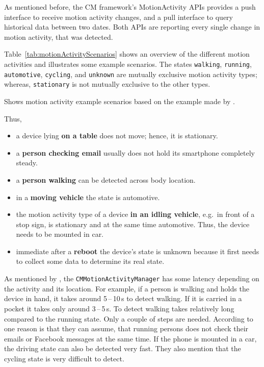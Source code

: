 As mentioned before, the \ac{CM} framework's MotionActivity \acsp{API} provides a push interface to receive motion activity changes, and a pull interface to query historical data between two dates. Both \acsp{API} are reporting every single change in motion activity, that was detected.

Table~\ref{tab:motionActivityScenarios} shows an overview of the different motion activities and illustrates some example scenarios. The states \texttt{walking}, \texttt{running}, \texttt{automotive}, \texttt{cycling}, and \texttt{unknown} are mutually exclusive motion activity types; whereas, \texttt{stationary} is not mutually exclusive to the other types.

\begin{table}
	
	\caption{Shows motion activity example scenarios based on the example made by \citet{apple:wwdc_2014_pham}.}
	\label{tab:motionActivityScenarios}
\end{table}


Thus,
\begin{itemize}
  \item a device lying \textbf{on a table} does not move; hence, it is stationary. %
  \item a \textbf{person checking email}  usually does not hold its smartphone completely steady.
  \item a \textbf{person walking} can be detected across body location.
  \item in a \textbf{moving vehicle} the state is automotive.
  \item the motion activity type of a device \textbf{in an idling vehicle}, e.g.\ in front of a stop sign, is stationary and at the same time automotive. Thus, the device needs to be mounted in car.

  \item immediate after a \textbf{reboot} the device's state is unknown because it first needs to collect some data to determine its real state.
\end{itemize}

\noindent As mentioned by \citet{apple:wwdc_2014_pham}, the \texttt{CMMotionActivityManager} has some latency depending on the activity and its location. For example, if a person is walking and holds the device in hand, it takes around 5\,--\,10\,s to detect walking. If it is carried in a pocket it takes only around 3\,--\,5\,s. To detect walking takes relatively long compared to the running state. Only a couple of steps are needed. According to \citet{apple:wwdc_2014_pham} one reason is that they can assume, that running persons does not check their emails or Facebook messages at the same time. If the phone is mounted in a car, the driving state can also be detected very fast. They also mention that the cycling state is very difficult to detect.

